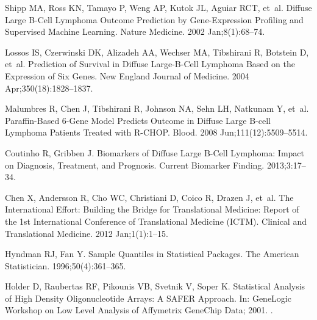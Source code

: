 \documentclass[10pt,letterpaper]{article}
\begin{document}
\begin{thebibliography}{10}
Shipp MA, Ross KN, Tamayo P, Weng AP, Kutok JL, Aguiar RCT, et~al.
\newblock Diffuse Large {B}-Cell Lymphoma Outcome Prediction by Gene-Expression
  Profiling and Supervised Machine Learning.
\newblock Nature Medicine. 2002 Jan;8(1):68--74.

Lossos IS, Czerwinski DK, Alizadeh AA, Wechser MA, Tibshirani R, Botstein D,
  et~al.
\newblock Prediction of Survival in Diffuse Large-{B}-Cell Lymphoma Based on
  the Expression of Six Genes.
\newblock New England Journal of Medicine. 2004 Apr;350(18):1828--1837.

Malumbres R, Chen J, Tibshirani R, Johnson NA, Sehn LH, Natkunam Y, et~al.
\newblock Paraffin-Based 6-Gene Model Predicts Outcome in Diffuse Large
  {B}-cell Lymphoma Patients Treated with {R-CHOP}.
\newblock Blood. 2008 Jun;111(12):5509--5514.

Coutinho R, Gribben J.
\newblock Biomarkers of Diffuse Large {B}-Cell Lymphoma: Impact on Diagnosis,
  Treatment, and Prognosis.
\newblock Current Biomarker Finding. 2013;3:17--34.

Chen X, Andersson R, Cho WC, Christiani D, Coico R, Drazen J, et~al.
\newblock The International Effort: Building the Bridge for Translational
  Medicine: Report of the 1st International Conference of Translational
  Medicine {(ICTM)}.
\newblock Clinical and Translational Medicine. 2012 Jan;1(1):1--15.

Hyndman RJ, Fan Y.
\newblock Sample Quantiles in Statistical Packages.
\newblock The American Statistician. 1996;50(4):361--365.

Holder D, Raubertas RF, Pikounis VB, Svetnik V, Soper K.
\newblock Statistical Analysis of High Density Oligonucleotide Arrays: A SAFER
  Approach.
\newblock In: GeneLogic Workshop on Low Level Analysis of Affymetrix GeneChip
  Data; 2001. .

\end{thebibliography}
\end{document}
